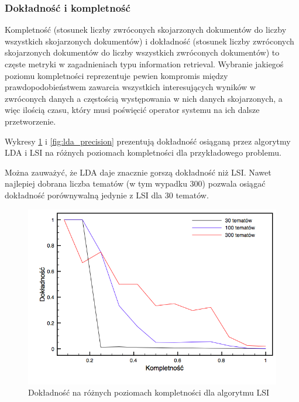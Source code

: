 \documentclass[11pt,a4paper]{article}
\begin{document}
\FloatBarrier

\subsubsection{Dokładność i kompletność}

Kompletność (stosunek liczby zwróconych skojarzonych dokumentów do liczby
wszystkich skojarzonych dokumentów) i dokładność (stosunek liczby zwróconych
skojarzonych dokumentów do liczby wszystkich zwróconych dokumentów) to częste
metryki w zagadnieniach typu information retrieval. Wybranie jakiegoś poziomu
kompletności reprezentuje pewien kompromis między prawdopodobieństwem zawarcia
wszystkich interesujących wyników w zwróconych danych a częstością
występowania w nich danych skojarzonych, a więc ilością czasu, który musi
poświęcić operator systemu na ich dalsze przetworzenie.

Wykresy \ref{fig:lsi_precision} i \ref{fig:lda_precision} prezentują dokładność
osiąganą przez algorytmy LDA i LSI na różnych poziomach kompletności dla
przykładowego problemu.

Można zauważyć, że LDA daje znacznie gorszą dokładność niż LSI. Nawet najlepiej
dobrana liczba tematów (w tym wypadku 300) pozwala osiągać dokładność
porównywalną jedynie z LSI dla 30 tematów.

\begin{figure}[h]
\includegraphics[width=\linewidth]{gfx/lsi_precision.png}
\caption{Dokładność na różnych poziomach kompletności dla algorytmu LSI}
\label{fig:lsi_precision}
\end{figure}
\end{document}

